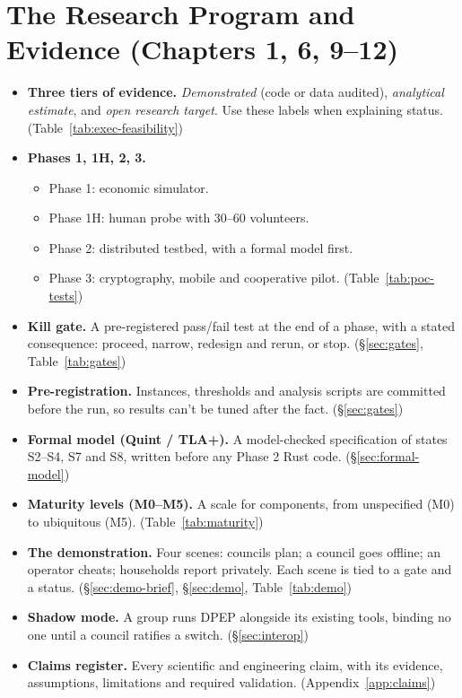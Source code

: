 \documentclass[10pt,twoside,openany]{book}
\theoremstyle{dpepstyle}
\begin{document}
\section*{The Research Program and Evidence (Chapters 1, 6, 9--12)}

\begin{itemize}[leftmargin=1.2em,itemsep=2pt,topsep=2pt]
\item \textbf{Three tiers of evidence.} \emph{Demonstrated} (code or data audited), \emph{analytical estimate}, and \emph{open research target}. Use these labels when explaining status. (Table~\ref{tab:exec-feasibility})
\item \textbf{Phases 1, 1H, 2, 3.}
\begin{itemize}[leftmargin=1.2em,itemsep=2pt,topsep=2pt]
\item Phase 1: economic simulator.
\item Phase 1H: human probe with 30--60 volunteers.
\item Phase 2: distributed testbed, with a formal model first.
\item Phase 3: cryptography, mobile and cooperative pilot. (Table~\ref{tab:poc-tests})
\end{itemize}
\item \textbf{Kill gate.} A pre-registered pass/fail test at the end of a phase, with a stated consequence: proceed, narrow, redesign and rerun, or stop. (\S\ref{sec:gates}, Table~\ref{tab:gates})
\item \textbf{Pre-registration.} Instances, thresholds and analysis scripts are committed before the run, so results can't be tuned after the fact. (\S\ref{sec:gates})
\item \textbf{Formal model (Quint / TLA+).} A model-checked specification of states S2--S4, S7 and S8, written before any Phase 2 Rust code. (\S\ref{sec:formal-model})
\item \textbf{Maturity levels (M0--M5).} A scale for components, from unspecified (M0) to ubiquitous (M5). (Table~\ref{tab:maturity})
\item \textbf{The demonstration.} Four scenes: councils plan; a council goes offline; an operator cheats; households report privately. Each scene is tied to a gate and a status. (\S\ref{sec:demo-brief}, \S\ref{sec:demo}, Table~\ref{tab:demo})
\item \textbf{Shadow mode.} A group runs DPEP alongside its existing tools, binding no one until a council ratifies a switch. (\S\ref{sec:interop})
\item \textbf{Claims register.} Every scientific and engineering claim, with its evidence, assumptions, limitations and required validation. (Appendix~\ref{app:claims})
\end{itemize}
\end{document}
